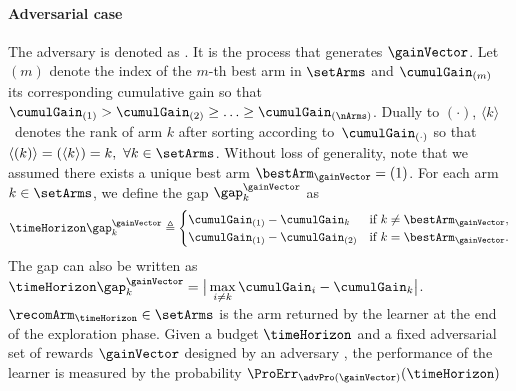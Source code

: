 \paragraph{Adversarial case} 
      The adversary is denoted as \advPro{}. It is the process that 
     generates $\gainVector$.
 Let $(m)$ denote 
the index of the $m$-th best arm in $\setArms$
 and $\cumulGain_{(m)}$ its corresponding 
 cumulative gain
 so that $\cumulGain_{(1)}> \cumulGain_{(2)} \geq \ldots 
 \geq \cumulGain_{(\nArms)}$. Dually to $(\cdot)$, $\langle k \rangle$~denotes 
 the rank of arm $k$ after sorting according to~$\cumulGain_{(\cdot)}$ so that $\langle (k) 
 \rangle=(\langle k \rangle)=k,~ \forall k\in \setArms$.
Without loss of generality, note that we assumed there 
exists
 a unique best arm $\bestArm_{\gainVector}=(1)$. %
%
%
For each arm $k\in \setArms$, we define the gap 
$\gap^\gainVector_k$ as
%
\begin{align*} 
\timeHorizon\gap^\gainVector_{k} \triangleq \begin{cases}  
\cumulGain_{(1)}-\cumulGain_{k} & \text{if } k \neq \bestArm_{\gainVector}, \\
\cumulGain_{(1)}-\cumulGain_{(2)}       & \text{if } k =\bestArm_{\gainVector}.
\end{cases}%
\end{align*}
%
The gap can also be written as 
$\timeHorizon\gap^\gainVector_{k} = \big|\max\limits_{i \neq k} 
\cumulGain_{i} - \cumulGain_{k}\big|$. 
%
%
 $\recomArm_{\timeHorizon} \in \setArms$ is the  arm 
returned by the learner at the end of the exploration phase.  
Given a budget
  $\timeHorizon$ and a fixed adversarial set of rewards 
  $\gainVector$ designed by an  adversary \advPro{}, the
   performance of the learner is measured by the 
   probability
    $\ProErr_{\advPro(\gainVector)}(\timeHorizon)$ 

